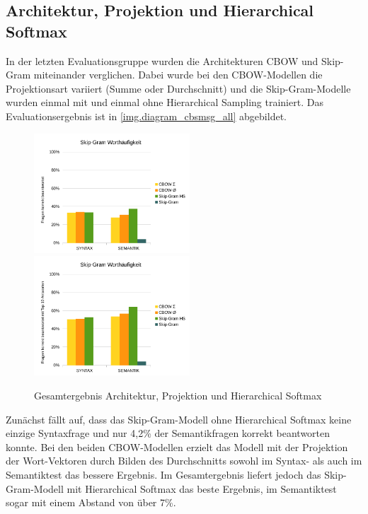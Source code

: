 \subsection{Architektur, Projektion und Hierarchical Softmax}
In der letzten Evaluationsgruppe wurden die Architekturen CBOW und Skip-Gram miteinander verglichen. Dabei wurde bei den CBOW-Modellen die Projektionsart variiert (Summe oder Durchschnitt) und die Skip-Gram-Modelle wurden einmal mit und einmal ohne Hierarchical Sampling trainiert. Das Evaluationsergebnis ist in \autoref{img.diagram_cbsmsg_all} abgebildet.

\begin{figure}[!ht]
\begin{adjustwidth}{-4mm}{-4mm}
\centering
{}
{\includegraphics[width=0.52\textwidth]{images/diagram_cbsmsg_correct_all}}
{\includegraphics[width=0.52\textwidth]{images/diagram_cbsmsg_top10_all}}
\caption[Gesamtergebnis Architektur, Projektion und Hierarchical Softmax]{Gesamtergebnis Architektur, Projektion und Hierarchical Softmax}\label{img.diagram_cbsmsg_all}
\end{adjustwidth}
\end{figure}

Zunächst fällt auf, dass das Skip-Gram-Modell ohne Hierarchical Softmax keine einzige Syntaxfrage und nur 4,2\% der Semantikfragen korrekt beantworten konnte. Bei den beiden CBOW-Modellen erzielt das Modell mit der Projektion der Wort-Vektoren durch Bilden des Durchschnitts sowohl im Syntax- als auch im Semantiktest das bessere Ergebnis. Im Gesamtergebnis liefert jedoch das Skip-Gram-Modell mit Hierarchical Softmax das beste Ergebnis, im Semantiktest sogar mit einem Abstand von über 7\%.

